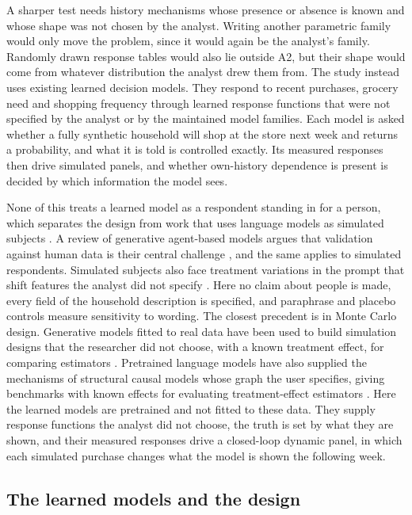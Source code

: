 \documentclass[11pt]{article}
\begin{document}
A sharper test needs history mechanisms whose presence or absence is known and whose shape
was not chosen by the analyst. Writing another parametric family would only move the problem,
since it would again be the analyst's family. Randomly drawn response tables would also lie
outside A2, but their shape would come from whatever distribution the analyst drew them from.
The study instead uses existing learned decision models. They respond to recent purchases,
grocery need and shopping frequency through learned response functions that were not specified
by the analyst or by the maintained model families. Each model is asked whether a fully synthetic
household will shop at the store next week and returns a probability, and what it is told is
controlled exactly. Its measured responses then drive simulated panels, and whether
own-history dependence is present is decided by which information the model sees.

None of this treats a learned model as a respondent standing in for a person, which separates the
design from work that uses language models as simulated subjects
\citep{horton2023,argyle2023,aher2023,brand_israeli_ngwe}. A review of generative agent-based
models argues that validation against human data is their central challenge
\citep{larooij2025}, and the same applies to simulated respondents. Simulated subjects also
face treatment variations in the prompt that shift features the analyst did not specify
\citep{gui_toubia}. Here no claim about people is made, every field of the household
description is specified, and paraphrase and placebo controls measure sensitivity to wording.
The closest precedent is in Monte Carlo design. Generative models fitted to real data have been
used to build simulation designs that the researcher did not choose, with a known treatment
effect, for comparing estimators \citep{athey2024}. Pretrained language models have also
supplied the mechanisms of structural causal models whose graph the user specifies, giving
benchmarks with known effects for evaluating treatment-effect estimators \citep{bynum_cho2025}.
Here the learned models are pretrained and not fitted to these data. They supply response
functions the analyst did not choose, the truth is set by what they are shown, and their
measured responses drive a closed-loop dynamic panel, in which each simulated purchase changes
what the model is shown the following week.

\subsection{The learned models and the design}
\label{sec:policies}
\end{document}
